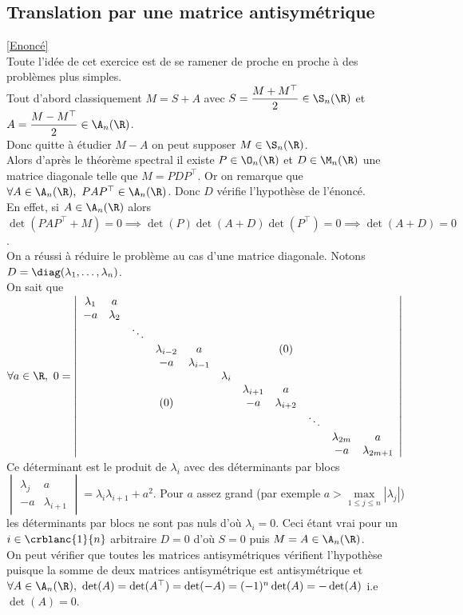 \documentclass[8pt]{book}
\begin{document}
	\subsection{Translation par une matrice antisymétrique }
	\label{Translation par une matrice antisymétrique corrigé}
	\textcolor{blue}{\hyperref[Translation par une matrice antisymétrique]{[Enoncé]}}\\
	Toute l'idée de cet exercice est de se ramener de proche en proche à des problèmes plus simples.\\
	Tout d'abord classiquement $M=S+A$ avec $S=\dfrac{M+M^\top}{2}\in \S_n(\R)$ et $A=\dfrac{M-M^\top}{2}\in \A_n(\R)$.\\
	Donc quitte à étudier $M-A$ on peut supposer $M\in \S_n(\R)$.\\
	Alors d'après le théorème spectral il existe $P\in \O_n(\R)$ et $D\in \M_n(\R)$ une matrice diagonale telle que $M=PDP^\top$. Or on remarque que $\forall A\in \A_n(\R),\ PAP^\top\in \A_n(\R)$. Donc $D$ vérifie l'hypothèse de l'énoncé.\\
	En effet, si $A\in \A_n(\R)$ alors $\det(PAP^\top+M)=0\implies \det(P)\det(A+D)\det(P^\top)=0\implies \det(A+D)=0$.\\
	On a réussi à réduire le problème au cas d'une matrice diagonale. Notons $D=\diag(\lambda_1,\dots,\lambda_n)$.\\
	On sait que $\forall a\in \R,\ 0=\left|\begin{array}{ccccccccccc}
		\lambda_1&a&&&&&&&&&\\
		-a&\lambda_2&&&&&&&&&\\
		&&\ddots&&&&&&&&\\
		&&&\lambda_{i-2}&a&&&(0)&&\\
		&&&-a&\lambda_{i-1}&&&&&\\
		&&&&&\lambda_i&&&&\\
		&&&&&&\lambda_{i+1}&a&&&\\
		&&&(0)&&&-a&\lambda_{i+2}&&&\\
		&&&&&&&&\ddots&&\\
		&&&&&&&&&\lambda_{2m}&a\\
		&&&&&&&&&-a&\lambda_{2m+1}
	\end{array}\right|$\\
	Ce déterminant est le produit de $\lambda_i$ avec des déterminants par blocs $\begin{vmatrix}
		\lambda_j&a\\
		-a&\lambda_{i+1}
	\end{vmatrix}=\lambda_i\lambda_{i+1}+a^2$. Pour $a$ assez grand (par exemple $a>\max\limits_{1\leq j\leq n}|\lambda_j|$) les déterminants par blocs ne sont pas nuls d'où $\lambda_i=0$. Ceci étant vrai pour un $i\in \crblanc{1}{n}$ arbitraire $D=0$ d'où $S=0$ puis $M=A\in \A_n(\R)$.\\
	On peut vérifier que toutes les matrices antisymétriques vérifient l'hypothèse puisque la somme de deux matrices antisymétrique est antisymétrique et $\forall A\in \A_n(\R),\ \det(A)=\det(A^\top)=\det(-A)=(-1)^n\det(A)=-\det(A)$ i.e $\det(A)=0$.
	
\end{document}
